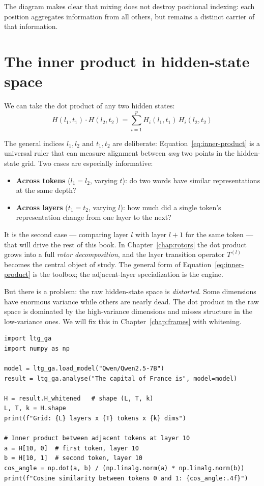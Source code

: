 \documentclass[11pt, twoside, openright]{memoir}
\newcommand{\ip}{\cdot}           %
\numberwithin{equation}{chapter}
\begin{document}
The diagram makes clear that mixing does not destroy positional
indexing: each position aggregates information from all others, but
remains a distinct carrier of that information.


\section{The inner product in hidden-state space}

We can take the dot product of any two hidden states:
\begin{equation}
\label{eq:inner-product}
  H(l_1, t_1) \ip H(l_2, t_2) = \sum_{i=1}^{p} H_i(l_1, t_1) \, H_i(l_2, t_2)
\end{equation}

The general indices $l_1, l_2$ and $t_1, t_2$ are deliberate:
Equation~\eqref{eq:inner-product} is a universal ruler that can measure
alignment between \emph{any} two points in the hidden-state grid.  Two
cases are especially informative:
\begin{itemize}[nosep]
\item \textbf{Across tokens} ($l_1 = l_2$, varying $t$): do two words
  have similar representations at the same depth?
\item \textbf{Across layers} ($t_1 = t_2$, varying $l$): how much did a
  single token's representation change from one layer to the next?
\end{itemize}

It is the second case --- comparing layer $l$ with layer $l+1$ for the
same token --- that will drive the rest of this book.  In
Chapter~\ref{chap:rotors} the dot product grows into a full
\emph{rotor decomposition}, and the layer transition operator
$T^{(l)}$ becomes the central object of study.  The general form of
Equation~\eqref{eq:inner-product} is the toolbox; the adjacent-layer
specialization is the engine.

But there is a problem: the raw hidden-state space is \emph{distorted}.
Some dimensions have enormous variance while others are nearly dead.
The dot product in the raw space is dominated by the high-variance
dimensions and misses structure in the low-variance ones.  We will fix
this in Chapter~\ref{chap:frames} with whitening.

\begin{lstlisting}[caption={Extracting hidden states and measuring inner products}]
import ltg_ga
import numpy as np

model = ltg_ga.load_model("Qwen/Qwen2.5-7B")
result = ltg_ga.analyse("The capital of France is", model=model)

H = result.H_whitened   # shape (L, T, k)
L, T, k = H.shape
print(f"Grid: {L} layers x {T} tokens x {k} dims")

# Inner product between adjacent tokens at layer 10
a = H[10, 0]  # first token, layer 10
b = H[10, 1]  # second token, layer 10
cos_angle = np.dot(a, b) / (np.linalg.norm(a) * np.linalg.norm(b))
print(f"Cosine similarity between tokens 0 and 1: {cos_angle:.4f}")
\end{lstlisting}
\end{document}
